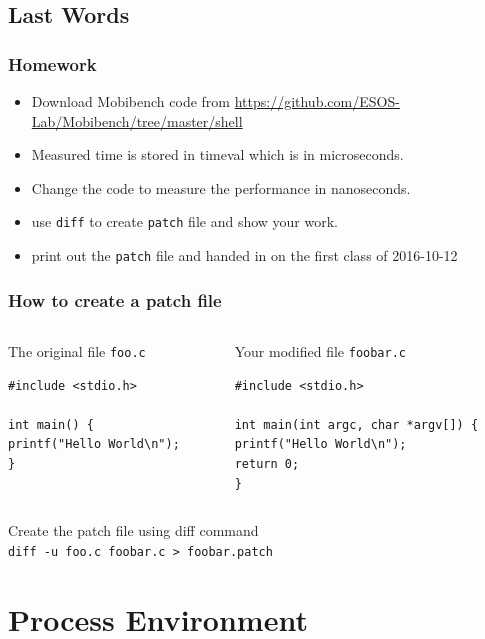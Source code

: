 \documentclass[newPxFont,sthlmFooter,nooffset]{beamer}
\begin{document}
\subsection{Last Words}
\begin{frame}[t]
  \frametitle{Homework}

  \begin{itemize}
  \item Download Mobibench code from \href{https://github.com/ESOS-Lab/Mobibench/tree/master/shell}{https://github.com/ESOS-Lab/Mobibench/tree/master/shell}
  \item Measured time is stored in timeval which is in microseconds. 
  \item Change the code to measure the performance in nanoseconds.
  \item use \texttt{diff} to create \texttt{patch} file and show your work.
  \item print out the \texttt{patch} file and handed in on the first class of 2016-10-12
  \end{itemize}
\end{frame}


\begin{frame}[containsverbatim,t]
  \frametitle{How to create a patch file}
\begin{columns}[t]
\begin{column}{0.45\textwidth}
The original file \texttt{foo.c}
\begin{lstlisting}
#include <stdio.h> 

int main() {
printf("Hello World\n");
}  
\end{lstlisting}
\end{column}
\begin{column}{0.45\textwidth}
Your modified file \texttt{foobar.c}
\begin{lstlisting}
#include <stdio.h>

int main(int argc, char *argv[]) {
printf("Hello World\n");
return 0;
} 
\end{lstlisting}
\end{column}
\end{columns}

Create the patch file using diff command \\ \texttt{diff -u foo.c foobar.c > foobar.patch }

{\footnotesize

}
\end{frame}


\section{Process Environment}
\end{document}
